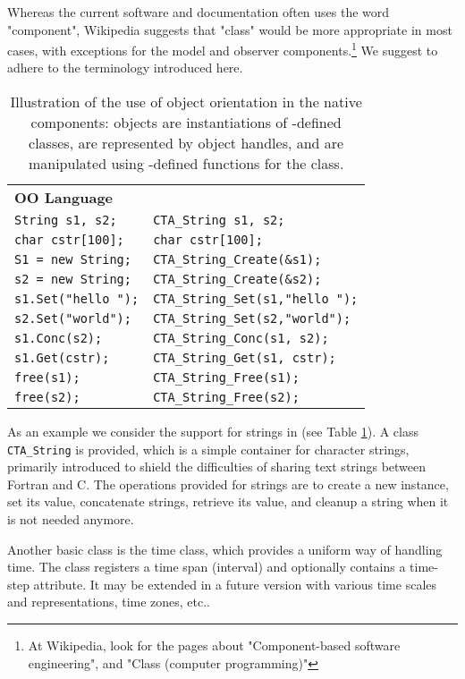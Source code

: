Whereas the current \oda software and documentation often uses the word "component", Wikipedia suggests that "class" would be more appropriate in most cases, with exceptions for the model and observer components.\footnote{At Wikipedia, look for the pages about "Component-based software engineering", and "Class (computer programming)"} We suggest to adhere to the terminology introduced here.

\begin{table}
\centering
\begin{tabular}{l l}
\textbf{OO Language}       &	\textbf{\oda}\\
\verb|String s1, s2;|      &	\verb|CTA_String s1, s2;|\\
\verb|char cstr[100];| &	\verb|char cstr[100];|\\
\verb|S1 = new String;|    &	\verb|CTA_String_Create(&s1);|\\
\verb|s2 = new String;|    &	\verb|CTA_String_Create(&s2);|\\
\verb|s1.Set("hello ");|   &	\verb|CTA_String_Set(s1,"hello ");|\\
\verb|s2.Set("world");|    &	\verb|CTA_String_Set(s2,"world");|\\
\verb|s1.Conc(s2);|        &	\verb|CTA_String_Conc(s1, s2);|\\
\verb|s1.Get(cstr);|       &	\verb|CTA_String_Get(s1, cstr);|\\
\verb|free(s1);|           &	\verb|CTA_String_Free(s1);|\\
\verb|free(s2);|           &	\verb|CTA_String_Free(s2);|\\
\end{tabular}
\caption{Illustration of the use of object orientation in the \oda native components: objects are instantiations of \oda-defined classes, are represented by object handles, and are manipulated using \oda-defined functions for the class.}\label{tab:OO}
\end{table}

As an example we consider the support for strings in \oda (see Table \ref{tab:OO}). A class \verb|CTA_String| is provided, which is a simple container for character strings, primarily introduced to shield the difficulties of sharing text strings between Fortran and C. The operations provided for \oda strings are to create a new instance, set its value, concatenate strings, retrieve its value, and cleanup a string when it is not needed anymore. 

Another basic class is the \oda time class, which provides a uniform way of handling time. The class registers a time span (interval) and optionally contains a time-step attribute. It may be extended in a future version with various time scales and representations, time zones, etc..

